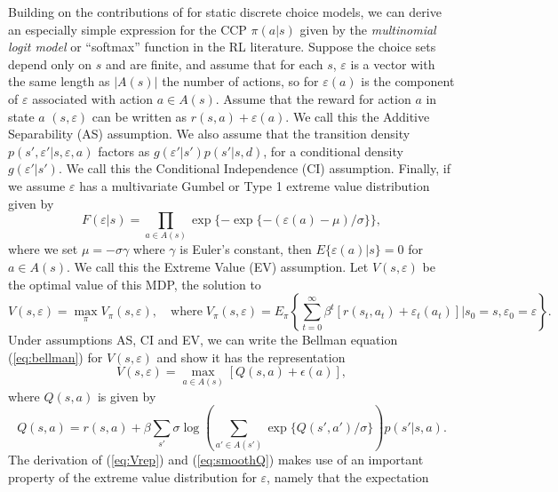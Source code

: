 Building on the contributions of \citet{mcfadden:1973} for static discrete choice
models, we can derive an especially simple expression for the CCP $\pi(a|s)$ given by
the {\it multinomial logit model\/} or ``softmax'' function in the RL literature.
Suppose the choice sets depend only on $s$ and are finite, and assume that for each
$s$, $\varepsilon$ is a vector with the same length as $|A(s)|$ the number of actions, so for
$\varepsilon(a)$ is the component of $\varepsilon$ associated with action $a \in A(s)$. Assume that 
the reward for action $a$ in state $a$ $(s,\varepsilon)$ can be written as $r(s,a)+\varepsilon(a)$. We call
this the Additive Separability (AS) assumption. We also assume
 that the transition density $p(s',\varepsilon'|s,\varepsilon,a)$ factors as $g(\varepsilon'|s')p(s'|s,d)$,
for a conditional density $g(\varepsilon'|s')$.
We call this the Conditional Independence (CI) assumption. Finally, if 
we assume $\varepsilon$ has a multivariate Gumbel or Type 1 extreme value distribution given by
\begin{equation}
    F(\varepsilon|s) = \prod_{a \in A(s)} \exp\{-\exp\{-(\varepsilon(a)-\mu)/\sigma\}\},
\label{eq:evd}
\end{equation}
where we set $\mu=-\sigma\gamma$ where $\gamma$ is Euler's constant, then $E\{\varepsilon(a)|s\}=0$ for $a \in A(s)$. 
We call this the Extreme Value (EV) assumption. Let $V(s,\varepsilon)$ be the optimal value of this MDP, the solution to
\begin{equation}
       V(s,\varepsilon)=\max_\pi  V_\pi(s,\varepsilon),  \quad \mbox{where} \;  V_\pi(s,\varepsilon) = E_\pi \left\{\sum_{t=0}^\infty \beta^t[r(s_t,a_t)+\varepsilon_t(a_t)]|s_0=s,\varepsilon_0=\varepsilon\right\}.
\label{eq:smoothV}
\end{equation}
Under assumptions AS, CI and EV, we can write the Bellman equation (\ref{eq:bellman}) for $V(s,\varepsilon)$ and show it 
has the representation
\begin{equation} V(s,\varepsilon)=\max_{a \in A(s)}[Q(s,a)+\epsilon(a)],
\label{eq:Vrep}
\end{equation}
where $Q(s,a)$ is given by
\begin{equation}
    Q(s,a) = r(s,a) + \beta \sum_{s'} \sigma \log\left(\sum_{a' \in A(s')} \exp\{Q(s',a')/\sigma\}\right)p(s'|s,a).
\label{eq:smoothQ}
\end{equation}
The derivation of (\ref{eq:Vrep}) and (\ref{eq:smoothQ}) makes use of an important
property of the extreme value distribution for $\varepsilon$, namely that the expectation
